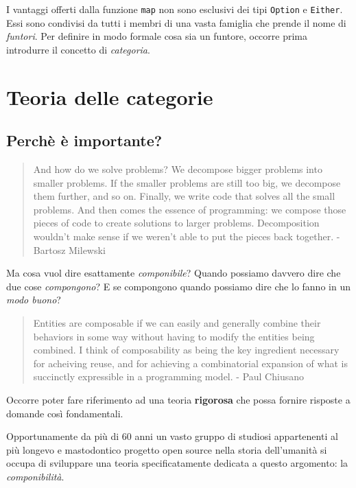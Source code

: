 \documentclass[12pt]{article}
\theoremstyle{definition}
\begin{document}
I vantaggi offerti dalla funzione \texttt{map} non sono esclusivi dei tipi \texttt{Option} e \texttt{Either}.
Essi sono condivisi da tutti i membri di una vasta famiglia che prende il nome di \emph{funtori}. Per definire in modo formale cosa sia un funtore,
occorre prima introdurre il concetto di \emph{categoria}.

\section{Teoria delle categorie}

\subsection{Perchè è importante?}

\begin{quote}
And how do we solve problems? We decompose bigger problems into smaller problems. If the smaller problems are still too big,
we decompose them further, and so on. Finally, we write code that solves all the small problems.
And then comes the essence of programming: we compose those pieces of code to create solutions to larger problems.
Decomposition wouldn’t make sense if we weren’t able to put the pieces back together. - Bartosz Milewski
\end{quote}

Ma cosa vuol dire esattamente \emph{componibile}? Quando possiamo davvero dire che due cose \emph{compongono}?
E se compongono quando possiamo dire che lo fanno in un \emph{modo buono}?\\

\begin{quote}
Entities are composable if we can easily and generally combine their behaviors in some way without having to modify the entities being combined.
I think of composability as being the key ingredient necessary for acheiving reuse, and for achieving a combinatorial expansion of
what is succinctly expressible in a programming model. - Paul Chiusano
\end{quote}

Occorre poter fare riferimento ad una teoria \textbf{rigorosa} che possa fornire risposte a domande così fondamentali.

Opportunamente da più di 60 anni un vasto gruppo di studiosi appartenenti al più longevo e mastodontico progetto open source nella storia
dell'umanità si occupa di sviluppare una teoria specificatamente dedicata a questo argomento: la \emph{componibilità}.
\end{document}
